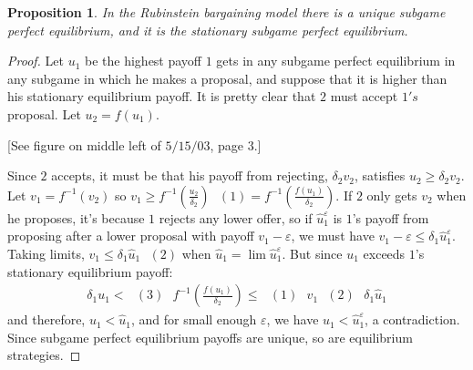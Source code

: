 \documentclass[12pt]{article}
\newtheorem{propo}{Proposition}[section]
\newcommand{\n}{\noindent}
\newcommand{\s}{\vspace{5mm}}
\begin{document}
\s
\n\begin{propo} In the Rubinstein bargaining model there is a unique subgame perfect equilibrium, and it is the stationary subgame perfect equilibrium.
\end{propo}
\begin{proof}  Let $u_1$ be the highest payoff $1$ gets in any subgame perfect equilibrium in any subgame in which he makes a proposal, and suppose that it is higher than his stationary equilibrium payoff.  It is pretty clear that $2$ must accept $1's$ proposal.  Let $u_2=f(u_1)$.
\begin{center}
[See figure on middle left of $5/15/03$, page 3.]
\end{center}
\noindent Since $2$ accepts, it must be that his payoff from rejecting, $\delta_2v_2$, satisfies $u_2\geq\delta_2v_2$.  Let $v_1=f^{-1}(v_2)$ so $v_1\geq f^{-1}\left(\frac{u_2}{\delta_2}\right)\mbox{ }(1)=f^{-1}\left(\frac{f(u_1)}{\delta_2}\right)$.  If $2$ only gets $v_2$ when he proposes, it's because $1$ rejects any lower offer, so if $\widehat{u}_1^{\varepsilon}$ is $1$'s payoff from proposing after a lower proposal with payoff $v_1-\varepsilon$, we must have $v_1-\varepsilon\leq\delta_1\widehat{u}_1^{\varepsilon}$.  Taking limits, $v_1\leq\delta_1\widehat{u}_1\mbox{ }(2)$ when $\widehat{u}_1=\lim\widehat{u}_1^{\varepsilon}$.  But since $u_1$ exceeds $1$'s stationary equilibrium payoff:
\begin{eqnarray*}
\delta_1u_1<\mbox{ }(3)\mbox{ }f^{-1}\left(\frac{f(u_1)}{\delta_2}\right)\leq\mbox{ }(1)\mbox{ }v_1\mbox{ }(2)\mbox{ }\delta_1\widehat{u}_1
\end{eqnarray*} and therefore, $u_1<\widehat{u}_1$, and for small enough $\varepsilon$, we have $u_1<\widehat{u}_1^{\varepsilon}$, a contradiction.  Since subgame perfect equilibrium payoffs are unique, so are equilibrium strategies.
\end{proof}
\end{document}
